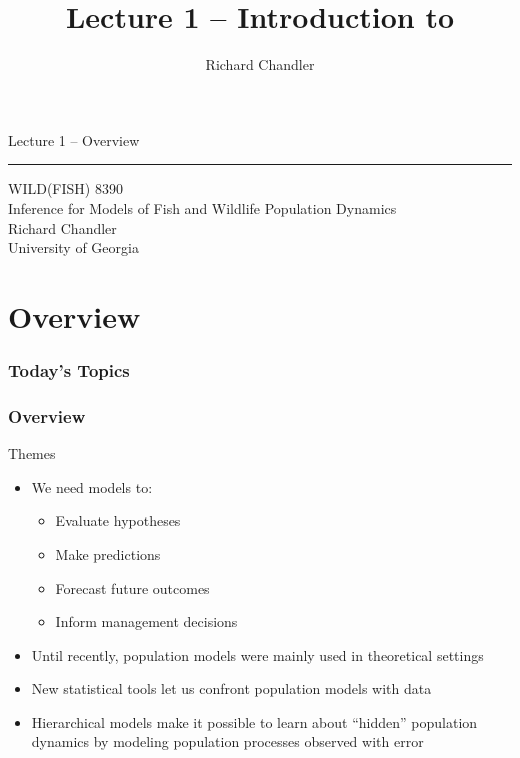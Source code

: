 \documentclass[color=usenames,dvipsnames]{beamer}\usepackage[]{graphicx}\usepackage[]{xcolor}
\title{Lecture 1 -- Introduction to }
\author{Richard Chandler}
\begin{document}
\begin{frame}[plain]
  \LARGE
  \centering
  {\huge %
    Lecture 1 -- Overview} \\
  {\color{default} \rule{\textwidth}{0.1pt}}
  \vfill
  \large
  WILD(FISH) 8390 \\
  Inference for Models of Fish and Wildlife Population Dynamics \\
  \vfill
  Richard Chandler \\
  University of Georgia
\end{frame}



\section{Overview}


\begin{frame}[plain]
  \frametitle{Today's Topics}
  \Large
\end{frame}



\begin{frame}[fragile]
  \frametitle{Overview}
  {\Large Themes}
  \begin{itemize}
    \item<1-> We need models to:
      \begin{itemize}[<1->]
        \item Evaluate hypotheses
        \item Make predictions
        \item Forecast future outcomes
        \item Inform management decisions
      \end{itemize}
    \item<2-> Until recently, population models were mainly used in theoretical settings
    \item<3-> New statistical tools let us confront population models with data
    \item<4-> Hierarchical models make it possible to learn about
      ``hidden'' population dynamics by modeling %
      population processes observed with error
  \end{itemize}
\end{frame}
\end{document}
